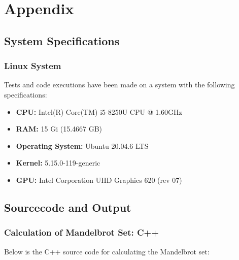 \chapter{Appendix}

\section{System Specifications}

\subsection{Linux System}
\label{app:system:mymachine}
Tests and code executions have been made on a system with the following specifications:

\begin{itemize}
    \item \textbf{CPU:} Intel(R) Core(TM) i5-8250U CPU @ 1.60GHz
    \item \textbf{RAM:} 15 Gi (15.4667 GB)
    \item \textbf{Operating System:} Ubuntu 20.04.6 LTS
    \item \textbf{Kernel:} 5.15.0-119-generic
    \item \textbf{GPU:} Intel Corporation UHD Graphics 620 (rev 07)
\end{itemize}

\section{Sourcecode and Output}

\subsection{Calculation of Mandelbrot Set: C++}
\label{app:code:mandelbrot1}
Below is the C++ source code for calculating the Mandelbrot set:


